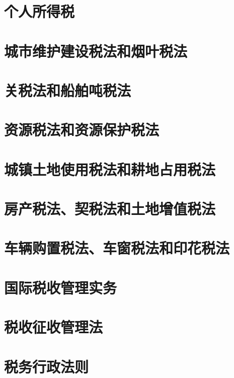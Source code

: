 \documentclass[UTF8,12pt]{ctexart}
\numberwithin{equation}{section} %
\numberwithin{figure}{section}
\numberwithin{table}{section}
\begin{document}
	\section{个人所得税}
	
	\section{城市维护建设税法和烟叶税法}
	
	\section{关税法和船舶吨税法}
	
	\section{资源税法和资源保护税法}
	
	\section{城镇土地使用税法和耕地占用税法}
	
	\section{房产税法、契税法和土地增值税法}
	
	\section{车辆购置税法、车窗税法和印花税法}
	
	\section{国际税收管理实务}
	
	\section{税收征收管理法}
	
	\section{税务行政法则}
	

	
\end{document}
